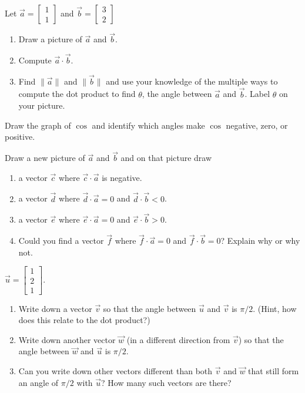 \documentclass[letter]{article}
\begin{document}
	\begin{Enum}
		\item Let $\vec a=\begin{bmatrix}1\\1\end{bmatrix}$ and $\vec b=\begin{bmatrix}3\\2\end{bmatrix}$
		\begin{enumerate}	
			\item Draw a picture of $\vec a $ and $\vec b$.
			\item Compute $\vec a\cdot \vec b$.
			\item Find $\|\vec a\|$ and $\|\vec b\|$ and use your knowledge of
			the multiple ways to compute the dot product to find $\theta$,
			the angle between $\vec a$ and $\vec b$. Label $\theta$ on your picture.
		\end{enumerate}
		\item Draw the graph of $\cos$ and identify which angles make $\cos$ negative, zero,
		or positive.

		\item Draw a new picture of $\vec a$ and $\vec b$ and on that picture draw
		\begin{enumerate}	
			\item a vector $\vec c$ where $\vec c\cdot \vec a$ is negative.
			\item a vector $\vec d$ where $\vec d\cdot \vec a=0$ and $\vec d\cdot \vec b < 0$.
			\item a vector $\vec e$ where $\vec e\cdot \vec a=0$ and $\vec e\cdot \vec b>0$.
			\item Could you find a vector $\vec f$ where $\vec f\cdot \vec a=0$ and $\vec f\cdot \vec b=0$?
			Explain why or why not.
		\end{enumerate}

		\item $\vec u=\begin{bmatrix}1\\2\\1\end{bmatrix}$.
		\begin{enumerate}
			\item Write down a vector $\vec v$ so that the angle between $\vec u$ and $\vec v$
			is $\pi/2$. (Hint, how does this relate to the dot product?)
			\item Write down another vector $\vec w$ (in a different direction from $\vec v$)
			so that the angle between $\vec w$ and $\vec u$ is $\pi/2$.
			\item Can you write down other vectors different than both $\vec v$ and $\vec w$ that still
			form an angle of $\pi/2$ with $\vec u$?  How many such vectors are there?
		\end{enumerate}
	\end{Enum}
\end{document}
